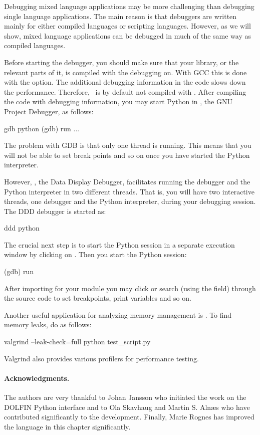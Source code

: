 Debugging mixed language applications may be more challenging than
debugging single language applications.  The main reason is that
debuggers are written mainly for either compiled languages or scripting
languages. However, as we will show, mixed language applications can be
debugged in much of the same way as compiled languages.

Before starting the debugger, you should make sure that your library,
or the relevant parts of it, is compiled with the debugging on. With
GCC this is done with the  option. The additional debugging
information in the code slows down the performance. Therefore, \dolfin\
is by default not compiled with .  After compiling the code
with debugging information, you may start Python in \citet{www:gdb},
the GNU Project Debugger, as follows:
\begin{bash}
gdb python
(gdb) run
...
\end{bash}
The problem with GDB is that only one thread is running. This means that
you will not be able to set break points and so on once you have started
the Python interpreter.

However, \citet{www:ddd}, the Data Display Debugger, facilitates running
the debugger and the Python interpreter in two different threads. That
is, you will have two interactive threads, one debugger and the Python
interpreter, during your debugging session. The DDD debugger is started
as:
\begin{bash}
ddd python
\end{bash}
The crucial next step is to start the Python session in a separate
execution window by clicking on \emp{View->Execution Window}.  Then you
start the Python session:
\begin{bash}
(gdb) run
\end{bash}
After importing for your module you may click or search (using the
\emp{Lookup} field) through the source code to set breakpoints, print
variables and so on.

Another useful application for analyzing memory management is
\citet{www:valgrind}. To find memory leaks, do as follows:
\begin{bash}
valgrind --leak-check=full python test_script.py
\end{bash}
Valgrind also provides various profilers for performance testing.

\paragraph{Acknowledgments.}

The authors are very thankful to Johan Jansson who initiated the work
on the DOLFIN Python interface and to Ola Skavhaug and Martin
S. Aln\ae s who have contributed significantly to the development.
Finally, Marie Rognes has improved the language in this chapter
significantly.

\endgroup
